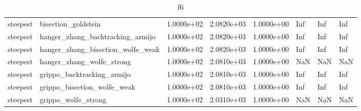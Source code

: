 \documentclass[a4paper,11pt]{article}
\numberwithin{equation}{section} %
\begin{document}
\begin{table}[h!]
{\begin{tabular}{|l|l|l|l|l|l|l|l|}
        steepest & bisection\_goldstein & 1.0000e+02 & 2.0820e+03 & 1.0000e+00 & Inf & Inf & Inf \\
        steepest & hanger\_zhang\_backtracking\_armijo & 1.0000e+02 & 2.0820e+03 & 1.0000e+00 & Inf & Inf & Inf \\
        steepest & hanger\_zhang\_bisection\_wolfe\_weak & 1.0000e+02 & 2.0820e+03 & 1.0000e+00 & Inf & Inf & Inf \\
        steepest & hanger\_zhang\_wolfe\_strong & 1.0000e+02 & 2.0810e+03 & 1.0000e+00 & NaN & NaN & NaN \\
        steepest & grippo\_backtracking\_armijo & 1.0000e+02 & 2.0810e+03 & 1.0000e+00 & Inf & Inf & Inf \\
        steepest & grippo\_bisection\_wolfe\_weak & 1.0000e+02 & 2.0810e+03 & 1.0000e+00 & Inf & Inf & Inf \\
        steepest & grippo\_wolfe\_strong & 1.0000e+02 & 2.0310e+03 & 1.0000e+00 & NaN & NaN & NaN \\

\end{tabular}}
\caption{f6}
\label{table:f6}
\end{table}
\end{document}
